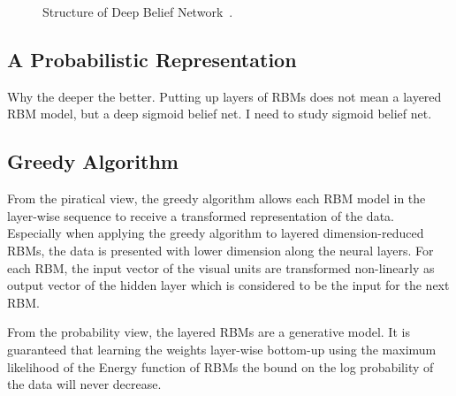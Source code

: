 \documentclass[11pt,twoside,a4paper]{article}
\begin{document}
	\begin{figure}[hbt]
	  \centering
	  \caption{
	  Structure of Deep Belief Network~\cite{arel2010deep}.
	  }
	  \label{Fig:dbn}
	\end{figure}
	
	\subsection{A Probabilistic Representation}
		Why the deeper the better.
	 	Putting up layers of RBMs does not mean a layered RBM model, but a deep sigmoid belief net.
	 	I need to study sigmoid belief net.
	\subsection{Greedy Algorithm}
		From the piratical view, the greedy algorithm allows each RBM model in the layer-wise sequence to receive a transformed representation of the data.
		Especially when applying the greedy algorithm to layered dimension-reduced RBMs, the data is presented with lower dimension along the neural layers.
		For each RBM, the input vector of the visual units are transformed non-linearly as output vector of the hidden layer which is considered to be the input for the next RBM.
		
		From the probability view, the layered RBMs are a generative model.
		It is guaranteed that learning the weights layer-wise bottom-up using the maximum likelihood of the Energy function of RBMs the bound on the log probability of the data will never decrease. 
\end{document}
